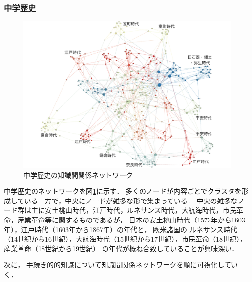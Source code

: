 \subsubsection{中学歴史}
\begin{figure}[!htb]
\begin{center}
	\includegraphics[width=330pt]{./img/c_his_label2.pdf}
	\caption{中学歴史の知識間関係ネットワーク}
	\label{fig:net_c_his}
\end{center}
\end{figure}
中学歴史のネットワークを図\ref{fig:net_c_his}に示す．
多くのノードが内容ごとでクラスタを形成している一方で，中央にノードが雑多な形で集まっている．
中央の雑多なノード群は主に安土桃山時代，江戸時代，ルネサンス時代，大航海時代，市民革命，産業革命等に関するものであるが，
日本の安土桃山時代（1573年から1603年），江戸時代（1603年から1867年）の年代と，
欧米諸国の
ルネサンス時代（14世紀から16世紀），大航海時代（15世紀から17世紀），市民革命（18世紀），産業革命（18世紀から19世紀）
の年代が概ね合致していることが興味深い．




次に，
手続き的的知識について知識間関係ネットワークを順に可視化していく．

